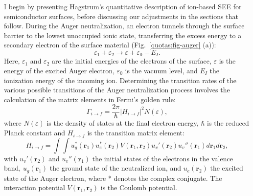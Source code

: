 \begin{refsection}
I begin by presenting Hagstrum's quantitative description of ion-based SEE 
for semiconductor surfaces, before discussing our adjustments in the sections 
that follow. During the Auger neutralization, an electron tunnels through the 
surface barrier to the lowest unoccupied ionic state, transferring the excess 
energy to a secondary electron of the surface material 
(Fig.~\ref{quotas:fig-auger} (a)): 
\begin{equation} \label{quotas:eq-energyconv} 
\varepsilon_1 + \varepsilon_2 \rightarrow \varepsilon + \varepsilon_0 - E_I. 
\end{equation} 
Here, $\varepsilon_1$ and $\varepsilon_2$ are the initial energies of the 
electrons of the surface, $\varepsilon$ is the energy of the excited Auger 
electron, $\varepsilon_0$ is the vacuum level, and $E_I$ the ionization energy 
of the incoming ion. Determining the transition rates of the various possible 
transitions of the Auger neutralization process involves the calculation of the 
matrix elements in Fermi's golden rule: 
\begin{equation} \label{quotas:eq-fermi} 
    \Gamma_{i\rightarrow f} = \frac{2\pi}{\hbar} \left| H_{i\rightarrow 
f}\right|^2 N(\varepsilon) , 
\end{equation} 
where $N(\varepsilon)$ is the density of states at the final electron energy, 
$\hbar$ is the reduced Planck constant and $H_{i\rightarrow f}$ is the 
transition matrix element: 
\begin{equation} 
    H_{i\rightarrow f} = \int \int u^*_g(\mathbf{r}_1) u^*_e(\mathbf{r}_2) 
V(\mathbf{r}_1, \mathbf{r}_2) u_v'(\mathbf{r}_2) u_v''(\mathbf{r}_1) 
d\mathbf{r}_1 d\mathbf{r}_2, 
\end{equation} 
with $ u_v'(\mathbf{r}_2)$ and $ u_v''(\mathbf{r}_1)$ the initial states of 
the electrons in the valence band, $u_g(\mathbf{r}_1)$ the ground state of the 
neutralized ion, and $u_e(\mathbf{r}_2)$ the excited state of the Auger 
electron, where * denotes the complex conjugate. The interaction potential 
$V(\mathbf{r}_1, \mathbf{r}_2)$ is the Coulomb potential. 
 

\end{refsection}
